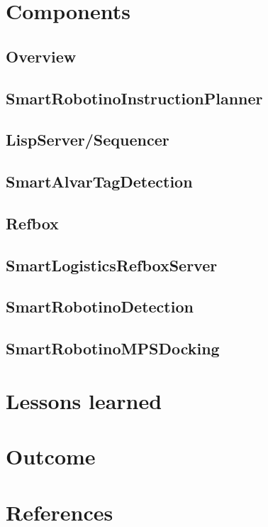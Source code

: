 \documentclass[12pt]{report}
\begin{document}
\chapter{Components}
	\label{ch:components}

\section{Overview}
	

\section{SmartRobotinoInstructionPlanner}
	
	\label{ch:SmartRobotinoInstructionPlanner}

\section{LispServer/Sequencer}
	

\section{SmartAlvarTagDetection}
	

\section{Refbox}


\section{SmartLogisticsRefboxServer}
	


\section{SmartRobotinoDetection}
	

\section{SmartRobotinoMPSDocking}
	

\chapter{Lessons learned}
    

\chapter{Outcome}
    

\chapter{References}
    


\printbibliography
\end{document}
